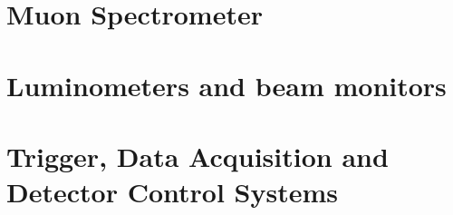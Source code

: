 % 
% 
% 



\section{Muon Spectrometer}
\section{Luminometers and beam monitors}
\section{Trigger, Data Acquisition and Detector Control Systems}

